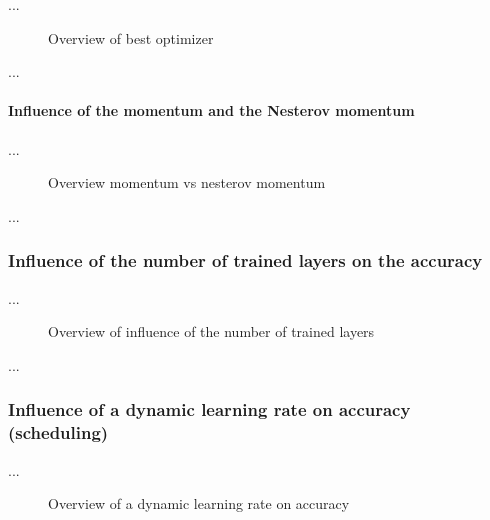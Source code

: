\documentclass[10pt]{article}
\newcommand\inputpgf[2]{{
\let\pgfimageWithoutPath\pgfimage
\renewcommand{\pgfimage}[2][]{\pgfimageWithoutPath[##1]{#1/##2}}

}}
\begin{document}
				\noindent ...

				\begin{figure}[H]
					\begin{center}
						
					\end{center}
					\caption{Overview of best optimizer}
					\label{fig:evaluation_momentum}
				\end{figure}

				\noindent ...

				\paragraph{Influence of the momentum and the Nesterov momentum}

				\noindent ...

				\begin{figure}[H]
					\begin{center}
						\inputpgf{images/evaluation}{momentum.pgf}
					\end{center}
					\caption{Overview momentum vs nesterov momentum}
					\label{fig:evaluation_momentum}
				\end{figure}

				\noindent ...
		
			\subsubsection{Influence of the number of trained layers on the accuracy}
	
				\noindent ...

				\begin{figure}[H]
					\begin{center}
						\inputpgf{images/evaluation}{number_trainable_layers.pgf}
					\end{center}
					\caption{Overview of influence of the number of trained layers}
					\label{fig:evaluation_number_trainable_layers}
				\end{figure}

				\noindent ...
		
			\subsubsection{Influence of a dynamic learning rate on accuracy (scheduling)}

				\noindent ...

				\begin{figure}[H]
					\begin{center}
						\inputpgf{images/evaluation}{scheduling_learning_rate.pgf}
					\end{center}
					\caption{Overview of a dynamic learning rate on accuracy}
					\label{fig:evaluation_scheduling_learning_rate}
				\end{figure}
\end{document}
